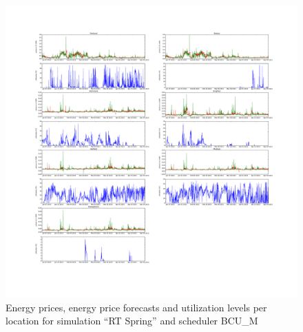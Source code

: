 \begin{figure}[htbp]
	\centering
	\vspace*{-0.6in}
	\hspace*{-1.4in}
		\includegraphics[width=1.60\textwidth]{figures/appendix_simulation_results/RT_Spring_scenario_5.pdf}
	\vspace*{-1.0in}
	\caption{Energy prices, energy price forecasts and utilization levels per location for simulation ``RT Spring'' and scheduler BCU\_M}
	\label{fig:app_RT_Spring_scenario_5}
\end{figure}

